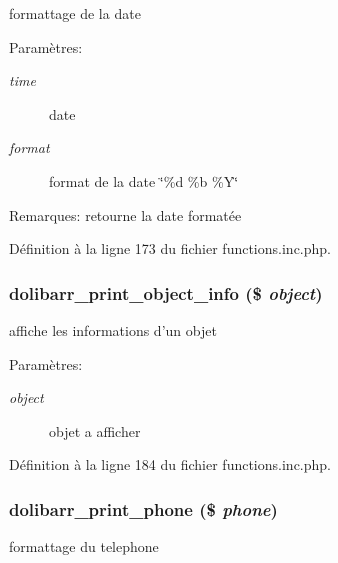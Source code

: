 formattage de la date 

\begin{Desc}
\item[Param\`{e}tres:]
\begin{description}
\item[{\em time}]date \item[{\em format}]format de la date \char`\"{}\%d \%b \%Y\char`\"{} \end{description}
\end{Desc}
\begin{Desc}
\item[Remarques:]retourne la date format\'{e}e \end{Desc}


D\'{e}finition \`{a} la ligne 173 du fichier functions.inc.php.\hypertarget{functions_8inc_8php_a7}{
\subsubsection[dolibarr\_\-print\_\-object\_\-info]{\setlength{\rightskip}{0pt plus 5cm}dolibarr\_\-print\_\-object\_\-info (\$ {\em object})}}
\label{functions_8inc_8php_a7}


affiche les informations d'un objet 

\begin{Desc}
\item[Param\`{e}tres:]
\begin{description}
\item[{\em object}]objet a afficher \end{description}
\end{Desc}


D\'{e}finition \`{a} la ligne 184 du fichier functions.inc.php.\hypertarget{functions_8inc_8php_a8}{
\subsubsection[dolibarr\_\-print\_\-phone]{\setlength{\rightskip}{0pt plus 5cm}dolibarr\_\-print\_\-phone (\$ {\em phone})}}
\label{functions_8inc_8php_a8}


formattage du telephone 


